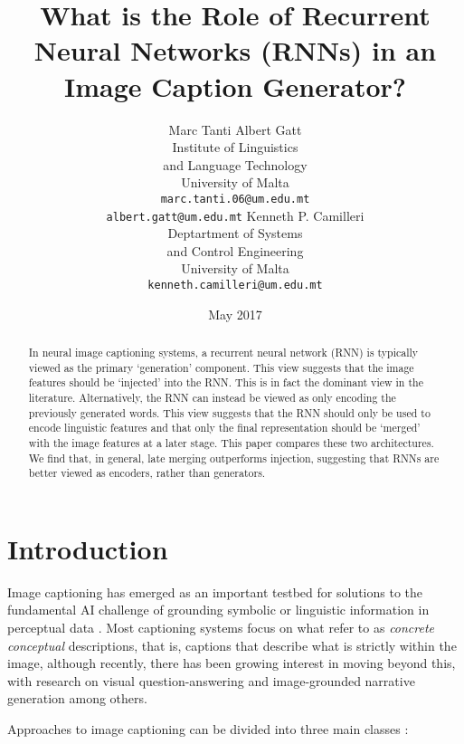 \documentclass[11pt,letterpaper]{article}
\title{What is the Role of Recurrent Neural Networks (RNNs) in an Image Caption Generator?}
\author{Marc Tanti \qquad Albert Gatt\\
	    Institute of Linguistics \\and Language Technology\\
	    University of Malta\\
	    {\tt marc.tanti.06@um.edu.mt}\\
        {\tt albert.gatt@um.edu.mt}        
	  	\And
		Kenneth P. Camilleri\\
  		Deptartment of Systems \\and Control Engineering\\
		University of Malta\\
  		{\tt kenneth.camilleri@um.edu.mt}
  }
\date{May 2017}
\begin{document}
\maketitle

\begin{abstract}
In neural image captioning systems, a recurrent neural network (RNN) is typically viewed as the primary `generation' component. This view suggests that the image features should be `injected' into the RNN. This is in fact the dominant view in the literature. Alternatively, the RNN can instead be viewed as only encoding the previously generated words. This view suggests that the RNN should only be used to encode linguistic features and that only the final representation should be `merged' with the image features at a later stage. This paper compares these two architectures. We find that, in general, late merging outperforms injection, suggesting that RNNs are better viewed as encoders, rather than generators.
\end{abstract}

\section{Introduction}\label{sec:intro}
Image captioning \cite{Bernardi2016} has emerged as an important testbed for solutions to the fundamental AI challenge of grounding symbolic or linguistic information in perceptual data \cite{Harnad1990,Roy2005}. Most captioning systems focus on what  refer to as {\em concrete conceptual} descriptions, that is, captions that describe what is strictly within the image, although recently, there has been growing interest in moving beyond this, with research on visual question-answering \cite{Antol2015} and image-grounded narrative generation \cite{Huang2016} among others. 

Approaches to image captioning can be divided into three main classes \cite{Bernardi2016}:
\end{document}
